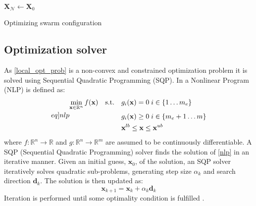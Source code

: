 \begin{algorithm}[H]
  \SetAlgoLined

  $\mathbf{X}_{\mathcal{N}}\gets \mathbf{X}_{0}$\;
   \caption{Optimizing swarm configuration}
   \label{alg:alg1}
  \end{algorithm}
\subsection{Optimization solver}
As \eqref{local_opt_prob} is a non-convex and constrained optimization problem it is solved using Sequential Quadratic Programming (SQP). 
In \cite{kraft1988software} a Nonlinear Program (NLP) is defined as:
\begin{equation}\label[eq]{nlp}
  \begin{split}
    \min_{\mathbf{x}\in\mathbb{R}^{n}}f(\mathbf{x})\quad\mathrm{s.t.}\quad&g_{i}(\mathbf{x}) = 0\;i\in\{1\hdots m_{e}\}\\
    &g_{i}(\mathbf{x}) \geq 0\;i\in\{m_{e}+1\hdots m\}\\
    &\mathbf{x}^{lb}\leq\mathbf{x}\leq\mathbf{x}^{ub}
  \end{split}
\end{equation}
where $f:\mathbb{R}^{n}\rightarrow\mathbb{R}$ and $g:\mathbb{R}^{n}\rightarrow\mathbb{R}^{m}$ are assumed to be continuously differentiable. A SQP (Sequential Quadratic Programming) solver finds the solution
of \eqref{nlp} in an iterative manner. Given an initial guess, $\mathbf{x}_{0}$, of the solution, an SQP solver iteratively solves quadratic sub-problems, generating step size $\alpha_{k}$ and search 
direction $\mathbf{d}_{k}$. The solution is then updated as:
\begin{equation}
  \mathbf{x}_{k+1} = \mathbf{x}_{k} + \alpha_{k}\mathbf{d}_{k}
\end{equation}
Iteration is performed until some optimality condition is fulfilled \cite{kraft1988software}.

